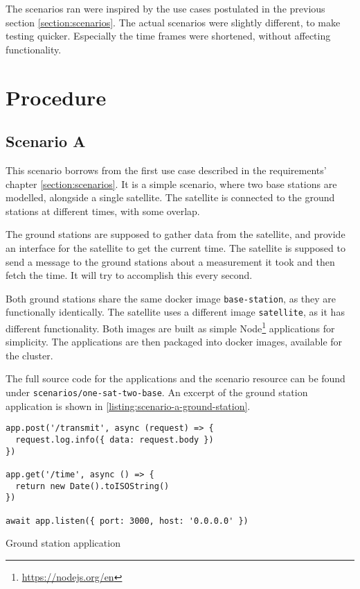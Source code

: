 The scenarios ran were inspired by the use cases postulated in the previous section \ref{section:scenarios}. The actual scenarios were slightly different, to make testing quicker. Especially the time frames were shortened, without affecting functionality.

\section{Procedure}

\subsection{Scenario A}

This scenario borrows from the first use case described in the requirements' chapter \ref{section:scenarios}. It is a simple scenario, where two base stations are modelled, alongside a single satellite. The satellite is connected to the ground stations at different times, with some overlap.

The ground stations are supposed to gather data from the satellite, and provide an interface for the satellite to get the current time. The satellite is supposed to send a message to the ground stations about a measurement it took and then fetch the time. It will try to accomplish this every second.

Both ground stations share the same docker image \verb|base-station|, as they are functionally identically. The satellite uses a different image \verb|satellite|, as it has different functionality. Both images are built as simple Node\footnote{\url{https://nodejs.org/en}} applications for simplicity. The applications are then packaged into docker images, available for the cluster.

The full source code for the applications and the scenario resource can be found under \verb|scenarios/one-sat-two-base|. An excerpt of the ground station application is shown in \ref{listing:scenario-a-ground-station}.

\begin{listing}[H]
  \begin{verbatim}
app.post('/transmit', async (request) => {
  request.log.info({ data: request.body })
})

app.get('/time', async () => {
  return new Date().toISOString()
})

await app.listen({ port: 3000, host: '0.0.0.0' })
\end{verbatim}
  \caption{Ground station application}
  \label{listing:scenario-a-ground-station}
\end{listing}

